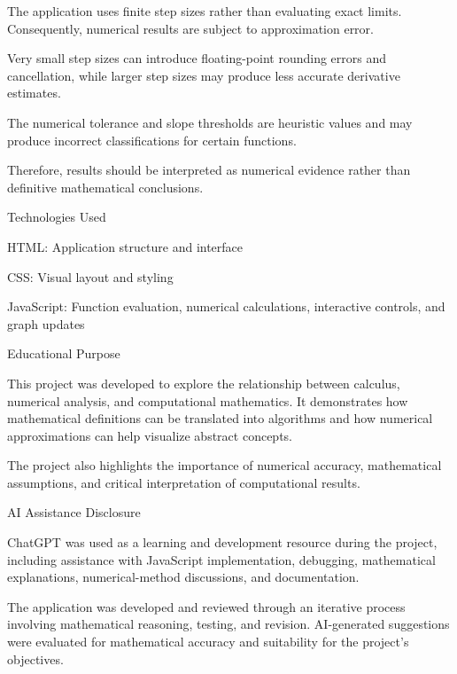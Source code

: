 The application uses finite step sizes rather than evaluating exact limits. Consequently, numerical results are subject to approximation error.

Very small step sizes can introduce floating-point rounding errors and cancellation, while larger step sizes may produce less accurate derivative estimates.

The numerical tolerance and slope thresholds are heuristic values and may produce incorrect classifications for certain functions.

Therefore, results should be interpreted as numerical evidence rather than definitive mathematical conclusions.

Technologies Used

HTML: Application structure and interface

CSS: Visual layout and styling

JavaScript: Function evaluation, numerical calculations, interactive controls, and graph updates

Educational Purpose

This project was developed to explore the relationship between calculus, numerical analysis, and computational mathematics. It demonstrates how mathematical definitions can be translated into algorithms and how numerical approximations can help visualize abstract concepts.

The project also highlights the importance of numerical accuracy, mathematical assumptions, and critical interpretation of computational results.

AI Assistance Disclosure

ChatGPT was used as a learning and development resource during the project, including assistance with JavaScript implementation, debugging, mathematical explanations, numerical-method discussions, and documentation.

The application was developed and reviewed through an iterative process involving mathematical reasoning, testing, and revision. AI-generated suggestions were evaluated for mathematical accuracy and suitability for the project's objectives.
